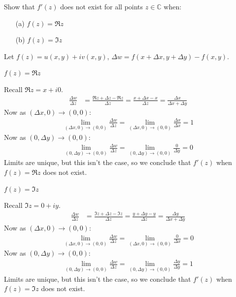\documentclass[12pt, english]{book}
\makeatletter
\renewenvironment{proof}[1][\proofname]{\par
	\pushQED{\qed}%
	\normalfont \topsep6\p@\@plus6\p@\relax
	\list{}{%
		\settowidth{\leftmargin}{\itshape\proofname:\hskip\labelsep}%
		\setlength{\labelwidth}{0pt}%
		\setlength{\itemindent}{-\leftmargin}%
		}%
	\item[\hskip\labelsep\itshape#1\@addpunct{:}]\ignorespaces
	}{\popQED\endlist\@endpefalse}
\makeatother
\begin{document}
	\begin{example}
		Show that \(f'(z)\) does not exist for all points \(z \in \mathbb{C}\) when:
		\begin{itemize}
			\item[(a)] \(f(z) = \Re{z}\)
			\item[(b)] \(f(z) = \Im{z}\)
		\end{itemize}
		\begin{proof}
			{\color{Grey}
			Let \(f(z) = u(x,y) + iv(x,y)\), \(\Delta w = f(x+\Delta x, y + \Delta y) - f(x,y)\).
			
			\underline{\(f(z) = \Re{z}\)}
			
			Recall \(\Re{z} = x + i0\).
			\begin{align*}
				\frac{\Delta w}{\Delta z}
					&= \frac{\Re{z + \Delta z} - \Re{z}}{\Delta z} 
					 = \frac{x + \Delta x - x }{\Delta z} 
					 = \frac{\Delta x}{\Delta x + \Delta y}
			\end{align*}
			Now as \((\Delta x, 0) \rightarrow (0,0)\):
			\begin{align*}
				\lim_{(\Delta x, 0) \rightarrow (0,0)} \frac{\Delta w}{\Delta z} = \lim_{(\Delta x, 0) \rightarrow (0,0)} \frac{\Delta x}{\Delta x} = 1
			\end{align*} 
			Now as \((0, \Delta y) \rightarrow (0,0)\):
			\begin{align*}
				\lim_{(0, \Delta y) \rightarrow (0,0)} \frac{\Delta w}{\Delta z} = \lim_{(0,\Delta y) \rightarrow (0,0)} \frac{0}{\Delta y} = 0
			\end{align*}
			Limits are unique, but this isn't the case, so we conclude that \(f'(z)\) when \(f(z) = \Re{z}\) does not exist.
			
			\underline{\(f(z) = \Im{z}\)}
			
			Recall \(\Im{z} = 0 + iy\).
			\begin{align*}
				\frac{\Delta w}{\Delta z}
					&= \frac{\Im{z + \Delta z} - \Im{z} }{\Delta z}
					 = \frac{y + \Delta y - y}{\Delta z}
					 = \frac{\Delta y}{\Delta x + \Delta y}
			\end{align*}
			Now as \((\Delta x, 0) \rightarrow (0,0)\):
			\begin{align*}
				\lim_{(\Delta x, 0) \rightarrow (0,0)}  \frac{\Delta w}{\Delta z} = \lim_{(\Delta x, 0) \rightarrow (0,0)}  \frac{0}{\Delta x} = 0
			\end{align*} 
			Now as \((0, \Delta y) \rightarrow (0,0)\):
			\begin{align*}
				\lim_{(0,\Delta y) \rightarrow (0,0)} \frac{\Delta w}{\Delta z} = \lim_{(0,\Delta y) \rightarrow (0,0)} \frac{\Delta y}{\Delta y} = 1
			\end{align*}
			Limits are unique, but this isn't the case, so we conclude that \(f'(z)\) when \(f(z) = \Im{z}\) does not exist.
			}
		\end{proof}
	\end{example}
\end{document}

